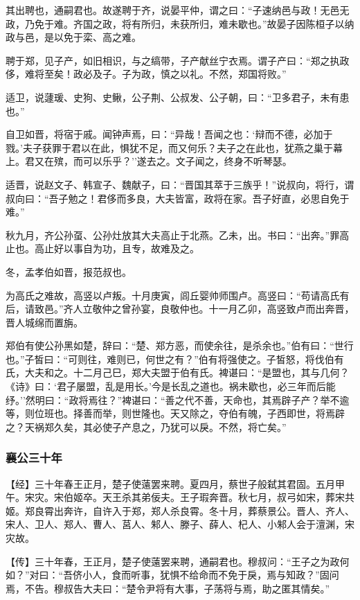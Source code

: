 \documentclass[]{article}
\begin{document}
其出聘也，通嗣君也。故遂聘于齐，说晏平仲，谓之曰：``子速纳邑与政！无邑无政，乃免于难。齐国之政，将有所归，未获所归，难未歇也。''故晏子因陈桓子以纳政与邑，是以免于栾、高之难。

聘于郑，见子产，如旧相识，与之缟带，子产献丝宁衣焉。谓子产曰：``郑之执政侈，难将至矣！政必及子。子为政，慎之以礼。不然，郑国将败。''

适卫，说蘧瑗、史狗、史鳅，公子荆、公叔发、公子朝，曰：``卫多君子，未有患也。''

自卫如晋，将宿于戚。闻钟声焉，曰：``异哉！吾闻之也：`辩而不德，必加于戮。'夫子获罪于君以在此，惧犹不足，而又何乐？夫子之在此也，犹燕之巢于幕上。君又在殡，而可以乐乎？''遂去之。文子闻之，终身不听琴瑟。

适晋，说赵文子、韩宣子、魏献子，曰：``晋国其萃于三族乎！''说叔向，将行，谓叔向曰：``吾子勉之！君侈而多良，大夫皆富，政将在家。吾子好直，必思自免于难。''

秋九月，齐公孙虿、公孙灶放其大夫高止于北燕。乙未，出。书曰：``出奔。''罪高止也。高止好以事自为功，且专，故难及之。

冬，孟孝伯如晋，报范叔也。

为高氏之难故，高竖以卢叛。十月庚寅，闾丘婴帅师围卢。高竖曰：``苟请高氏有后，请致邑。''齐人立敬仲之曾孙宴，良敬仲也。十一月乙卯，高竖致卢而出奔晋，晋人城绵而置旃。

郑伯有使公孙黑如楚，辞曰：``楚、郑方恶，而使余往，是杀余也。''伯有曰：``世行也。''子皙曰：``可则往，难则已，何世之有？''伯有将强使之。子皙怒，将伐伯有氏，大夫和之。十二月己巳，郑大夫盟于伯有氏。裨谌曰：``是盟也，其与几何？《诗》曰：`君子屡盟，乱是用长。'今是长乱之道也。祸未歇也，必三年而后能纾。''然明曰：``政将焉往？''裨谌曰：``善之代不善，天命也，其焉辟子产？举不逾等，则位班也。择善而举，则世隆也。天又除之，夺伯有魄，子西即世，将焉辟之？天祸郑久矣，其必使子产息之，乃犹可以戾。不然，将亡矣。''

\hypertarget{header-n2302}{%
\subsubsection{襄公三十年}\label{header-n2302}}

【经】三十年春王正月，楚子使薳罢来聘。夏四月，蔡世子般弑其君固。五月甲午。宋灾。宋伯姬卒。天王杀其弟佞夫。王子瑕奔晋。秋七月，叔弓如宋，葬宋共姬。郑良霄出奔许，自许入于郑，郑人杀良霄。冬十月，葬蔡景公。晋人、齐人、宋人、卫人、郑人、曹人、莒人、邾人、滕子、薛人、杞人、小邾人会于澶渊，宋灾故。

【传】三十年春，王正月，楚子使薳罢来聘，通嗣君也。穆叔问：``王子之为政何如？''对曰：``吾侪小人，食而听事，犹惧不给命而不免于戾，焉与知政？''固问焉，不告。穆叔告大夫曰：``楚令尹将有大事，子荡将与焉，助之匿其情矣。''
\end{document}
